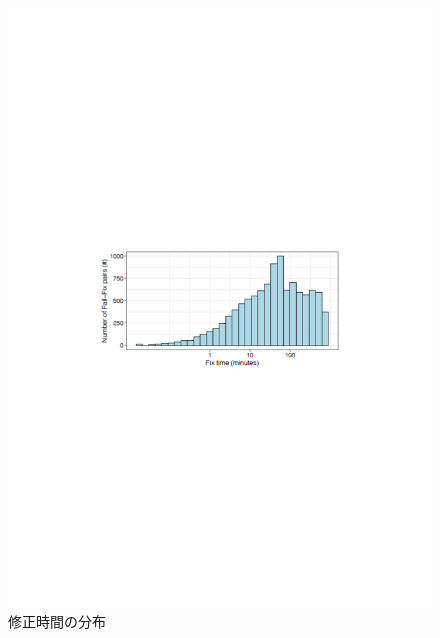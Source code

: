 \begin{figure}[t]
    \centering
    \includegraphics[width=0.9\linewidth, angle=0]{./thesis3/docker-build-failuer-number3.pdf}
    \caption{修正時間の分布}
    \label{fig:3_docker-build-failuer-number}
\end{figure}


